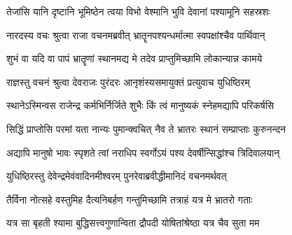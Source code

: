 \twolineshloka
{तेजांसि यानि दृष्टानि भूमिष्ठेन त्वया विभो}
{वेश्मानि भुवि देवानां पश्यामूनि सहस्रशः}


\twolineshloka
{नारदस्य वचः श्रुत्वा राजा वचनमब्रवीत्}
{भ्रातॄनपश्यन्धर्मात्मा स्वपक्षांश्चैव पार्थिवान्}


\twolineshloka
{शुभं वा यदि वा पापं भ्रातॄणां स्थानमद्य मे}
{तदेव प्राप्तुमिच्छामि लोकान्यान्न कामये}


\twolineshloka
{राज्ञस्तु वचनं श्रुत्वा देवराजः पुरंदरः}
{आनृशंस्यसमायुक्तं प्रत्युवाच युधिष्ठिरम्}


\twolineshloka
{स्थानेऽस्मिन्वस राजेन्द्र कर्मभिर्निर्जिते शुभैः}
{किं त्वं मानुष्यकं स्नेहमद्यापि परिकर्षसि}


\twolineshloka
{सिद्धिं प्राप्तोसि परमां यता नान्यः पुमान्क्वचित्}
{नैव ते भ्रातरः स्थानं सम्प्राप्ताः कुरुनन्दन}


\twolineshloka
{अद्यापि मानुषो भावः स्पृशते त्वां नराधिप}
{स्वर्गोऽयं पश्य देवर्षीन्सिद्धांश्च त्रिदिवालयान्}


\twolineshloka
{युधिष्ठिरस्तु देवेन्द्रमेवंवादिनमीश्वरम्}
{पुनरेवाब्रवीद्धीमानिदं वचनमर्थवत्}


\twolineshloka
{तैर्विना नोत्सहे वस्तुमिह दैत्यनिबर्हण}
{गन्तुमिच्छामि तत्राहं यत्र मे भ्रातरो गताः}


\twolineshloka
{यत्र सा बृहती श्यामा बुद्धिसत्त्वगुणान्विता}
{द्रौपदी योषितांश्रेष्ठा यत्र चैव सुता मम}


